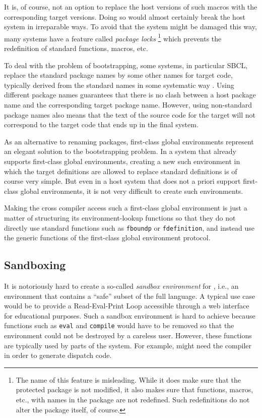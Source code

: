 It is, of course, not an option to replace the host versions of such
macros with the corresponding target versions.  Doing so would almost
certainly break the host system in irreparable ways.  To avoid that
the system might be damaged this way,
many \commonlisp{} systems have a feature called \emph{package locks}%
\footnote{The name of this feature is misleading.  While it does make
  sure that the protected package is not modified, it also makes sure
  that functions, macros, etc., with names in the package are not
  redefined.  Such redefinitions do not alter the package itself, of
  course.}
which prevents the redefinition of standard \commonlisp{} functions,
macros, etc.

To deal with the problem of bootstrapping, some systems, in particular
SBCL, replace the standard package names by some other names for
target code, typically derived from the standard names in some
systematic way \cite{Rhodes:2008:SSC:1482373.1482380}.  Using
different package names guarantees that there is no clash between a
host package name and the corresponding target package name.  However,
using non-standard package names also means that the text of the
source code for the target will not correspond to the target code that
ends up in the final system.

As an alternative to renaming packages, first-class global
environments represent an elegant solution to the bootstrapping
problem.  In a system that already supports first-class global
environments, creating a new such environment in which the target
definitions are allowed to replace standard \commonlisp{} definitions
is of course very simple.  But even in a host system that does not a
priori support first-class global environments, it is not very
difficult to create such environments.

Making the cross compiler access such a first-class global environment
is just a matter of structuring its environment-lookup functions so
that they do not directly use standard \commonlisp{} functions such as
\texttt{fboundp} or \texttt{fdefinition}, and instead use the generic
functions of the first-class global environment protocol.

\subsection{Sandboxing}

It is notoriously hard to create a so-called \emph{sandbox
  environment} for \commonlisp{}, i.e., an environment that contains a
``safe'' subset of the full language.  A typical use case would be to
provide a Read-Eval-Print Loop accessible through a web interface for
educational purposes.  Such a sandbox environment is hard to achieve
because functions such as \texttt{eval} and \texttt{compile} would
have to be removed so that the environment could not be destroyed by a
careless user.  However, these functions are typically used by parts
of the system.  For example, \clos{} might need the compiler in order
to generate dispatch code.

